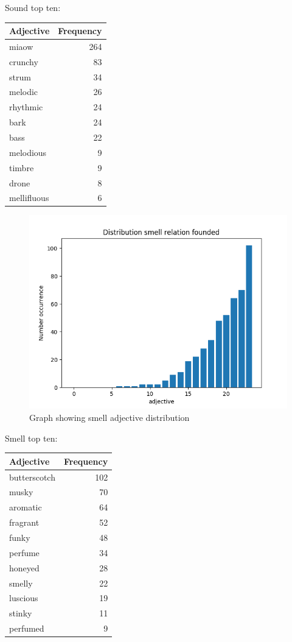 \documentclass[conference,compsoc]{IEEEtran}
\begin{document}
Sound top ten:
\begin{tabular}{lr}
\hline
 Adjective   &   Frequency \\
\hline
 miaow       &         264 \\
 crunchy     &          83 \\
 strum       &          34 \\
 melodic     &          26 \\
 rhythmic    &          24 \\
 bark        &          24 \\
 bass        &          22 \\
 melodious   &           9 \\
 timbre      &           9 \\
 drone       &           8 \\
 mellifluous &           6 \\
\hline
\end{tabular}



\begin{figure}[h]
\centering
\includegraphics[scale=0.52]{smell_plot}
\caption{ Graph showing smell adjective distribution}
\end{figure}

Smell top ten:
\begin{tabular}{lr}
\hline
 Adjective    &   Frequency \\
\hline
 butterscotch &         102 \\
 musky        &          70 \\
 aromatic     &          64 \\
 fragrant     &          52 \\
 funky        &          48 \\
 perfume      &          34 \\
 honeyed      &          28 \\
 smelly       &          22 \\
 luscious     &          19 \\
 stinky       &          11 \\
 perfumed     &           9 \\
\hline
\end{tabular}
\end{document}
